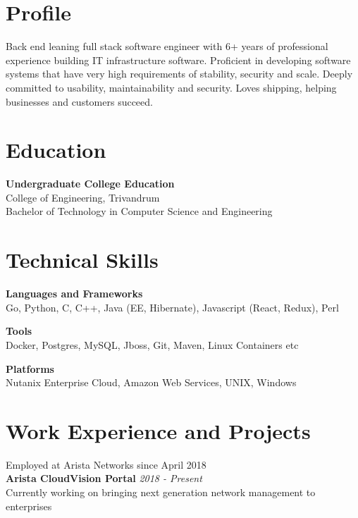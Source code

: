 \documentclass[line,margin]{res}
\begin{document}


\address{joji\_antony@gmx.com}
\address{+91 96323 41954}

\begin{resume}

\section{Profile}
Back end leaning full stack software engineer with 6+ years of professional experience building IT infrastructure software. Proficient in developing software systems that have very high requirements of stability, security and scale. Deeply committed to usability, maintainability and security. Loves shipping, helping businesses and customers succeed.

\section{Education}
{\bf Undergraduate College Education}\\
College of Engineering, Trivandrum\\
Bachelor of Technology in Computer Science and Engineering\\

\section{Technical Skills}

{\bf Languages and Frameworks}\\
Go, Python, C, C++, Java (EE, Hibernate), Javascript (React, Redux), Perl

{\bf Tools}\\
Docker, Postgres, MySQL, Jboss, Git, Maven, Linux Containers etc

{\bf Platforms}\\
Nutanix Enterprise Cloud, Amazon Web Services, UNIX, Windows

\section{Work Experience and Projects}

Employed at Arista Networks since April 2018\\

{\bf Arista CloudVision Portal} \hfill {\it{2018 - Present}}\\

Currently working on bringing next generation network management to enterprises\\


\end{resume}
\end{document}
